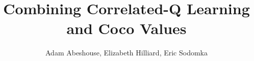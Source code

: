 \documentclass[]{article}
\title{Combining Correlated-Q Learning and Coco Values}
\author{Adam Abeshouse, Elizabeth Hilliard, Eric Sodomka}
\date{\vspace{-5ex}}                                          %
\begin{document}
\maketitle



\pagebreak

\pagebreak


\end{document}
